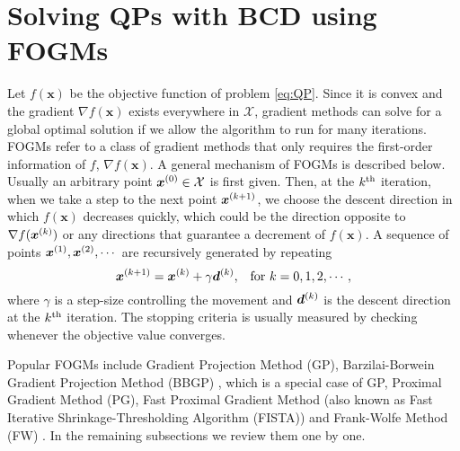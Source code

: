 \section{Solving QPs with BCD using FOGMs}\label{sec:SOLVE_QPs_BY_FOGMs}
Let $f(\bm x)$ be the objective function of problem \eqref{eq:QP}.
Since it is convex and the gradient $\nabla f(\bm x)$ exists everywhere in
$\mathcal X$, gradient methods can solve for a global optimal solution if we
allow the algorithm to run for many iterations.
FOGMs refer to a class of gradient methods that only requires the first-order
information of $f$, \ie $\nabla f(\bm x)$.
A general mechanism of FOGMs is described below.
Usually an arbitrary point $\bm x^{(0)} \in \mathcal X$ is first given.
Then, at the $k^\text{th}$ iteration, when we take a step to the next point
$\bm x^{(k+1)}$, we choose the descent direction in which $f(\bm x)$
decreases quickly, which could be the direction opposite to
$\nabla f(\bm x^{(k)})$ or any directions that guarantee a decrement of
$f(\bm x)$.
A sequence of points $\bm x^{(1)},\bm x^{(2)},\cdots$ are recursively
generated by repeating
\begin{equation}
    \bm x^{(k+1)} = \bm x^{(k)} + \gamma \bm d^{(k)},
    \;\;\;\text{for } k = 0,1,2,\cdots,
    \label{eq:FOGM_update}
\end{equation}
where $\gamma$ is a step-size controlling the movement and $\bm d^{(k)}$ is
the descent direction at the $k^\text{th}$ iteration.
The stopping criteria is usually measured by checking whenever the objective
value converges.

Popular FOGMs include Gradient Projection Method (GP), Barzilai-Borwein
Gradient Projection Method (BBGP) \cite{BARZILAI_BORWEIN_ALGORITHM}, which is
a special case of GP, Proximal Gradient Method (PG), Fast Proximal Gradient
Method (also known as Fast Iterative Shrinkage-Thresholding Algorithm (FISTA))
\cite{NESTEROV_FISTA,A_FAST_ITERA_SHRINK_THRESH_ALGO} and Frank-Wolfe Method
(FW) \cite{FRANKWOLFE_AN_ALGO_FOR_QUAD_PRGM}.
In the remaining subsections we review them one by one.

